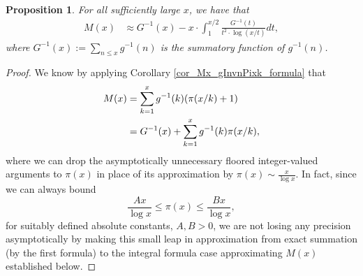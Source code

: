 \documentclass[11pt,reqno,a4letter]{article}
\numberwithin{figure}{section}
\numberwithin{table}{section}
\theoremstyle{plain}
\newtheorem{prop}[theorem]{Proposition}
\numberwithin{theorem}{section}
\theoremstyle{definition}
\begin{document}
\begin{prop}
\label{prop_Mx_SBP_IntegralFormula} 
For all sufficiently large $x$, we have that 
\begin{align} 
\label{eqn_pf_tag_v2-restated_v2} 
M(x) & \approx G^{-1}(x) - x \cdot \int_1^{x/2} \frac{G^{-1}(t)}{t^2 \cdot \log(x/t)} dt, 
\end{align} 
where $G^{-1}(x) := \sum_{n \leq x} g^{-1}(n)$ is the summatory function of $g^{-1}(n)$. 
\end{prop} 
\begin{proof} 
We know by applying Corollary \ref{cor_Mx_gInvnPixk_formula} that 
\begin{align} 
\notag
M(x) & = \sum_{k=1}^{x} g^{-1}(k) (\pi(x/k)+1) \\ 
\notag
     & = G^{-1}(x) + \sum_{k=1}^{x} g^{-1}(k) \pi(x/k), 
\end{align} 
where we can drop the asymptotically unnecessary floored integer-valued arguments to $\pi(x)$ in place of 
its approximation by $\pi(x) \sim \frac{x}{\log x}$. In fact, since we can always 
bound $$\frac{Ax}{\log x} \leq \pi(x) \leq \frac{Bx}{\log x},$$ for suitably defined 
absolute constants, $A,B > 0$, we are not losing any precision asymptotically by making 
this small leap in approximation from exact summation (by the first formula) to the 
integral formula case approximating $M(x)$ established below. 


\end{proof}
\end{document}
